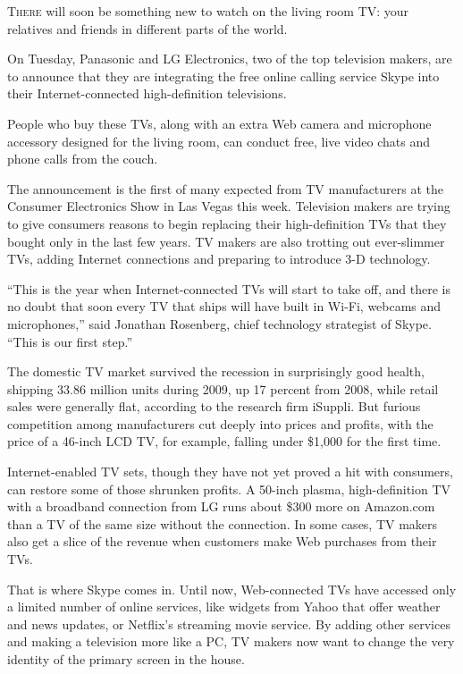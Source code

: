 ﻿\documentclass[12pt]{article}
\begin{document}
\lettrine{T}{here} will soon be something new to watch on the living room
TV: your relatives and friends in different parts of the world.

On Tuesday, Panasonic and LG Electronics, two of the top television makers, are to announce that
they are integrating the free online calling service Skype into their Internet-connected
high-definition televisions.

People who buy these TVs, along with an extra Web camera and microphone accessory designed for the
living room, can conduct free, live video chats and phone calls from the couch.

The announcement is the first of many expected from TV manufacturers at the Consumer Electronics
Show in Las Vegas this week. Television makers are trying to give consumers reasons to begin
replacing their high-definition TVs that they bought only in the last few years. TV makers are also
trotting out ever-slimmer TVs, adding Internet connections and preparing to introduce 3-D
technology.

``This is the year when Internet-connected TVs will start to take off, and there is no doubt that
soon every TV that ships will have built in Wi-Fi, webcams and microphones,'' said Jonathan
Rosenberg, chief technology strategist of Skype. ``This is our first step.''

The domestic TV market survived the recession in surprisingly good health, shipping 33.86 million
units during 2009, up 17 percent from 2008, while retail sales were generally flat, according to the
research firm iSuppli. But furious competition among manufacturers cut deeply into prices and
profits, with the price of a 46-inch LCD TV, for example, falling under \$1,000 for the first time.

Internet-enabled TV sets, though they have not yet proved a hit with consumers, can restore some of
those shrunken profits. A 50-inch plasma, high-definition TV with a broadband connection from LG
runs about \$300 more on Amazon.com than a TV of the same size without the connection. In some
cases, TV makers also get a slice of the revenue when customers make Web purchases from their TVs.

That is where Skype comes in. Until now, Web-connected TVs have accessed only a limited number of
online services, like widgets from Yahoo that offer weather and news updates, or Netflix's streaming
movie service. By adding other services and making a television more like a PC, TV makers now want
to change the very identity of the primary screen in the house.
\end{document}
